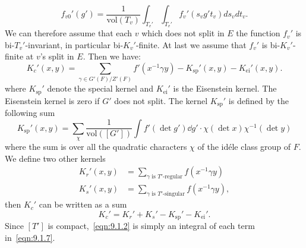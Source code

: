 \begin{equation*}
    f_{v0}'(g') = \frac{1}{\mathrm{vol}(T_v)} \int_{T_v'} \int_{T_v'} f_v'(s_v g' t_v) ds_v dt_v.
\end{equation*}
We can therefore assume that each $v$ which does not split in $E$ the function $f_v'$ is bi-$T_v'$-invariant, in particular 
bi-$K_v'$-finite. 
At last we assume that $f_v'$ is bi-$K_v'$-finite at $v$'s split in $E$. 
Then we have:
\begin{equation}
    K_c'(x, y) = \sum_{\gamma \in G'(F)/Z'(F)} f'(x^{-1}\gamma y) - K_{\mathrm{sp}}' (x, y) - K_{\mathrm{ei}}' (x, y).
\end{equation}
where $K_{\mathrm{sp}}'$ denote the special kernel and $K_{\mathrm{ei}}'$ is the Eisenstein kernel.
The Eisenstein kernel is zero if $G'$ does not split.
The kernel $K_{\mathrm{sp}}'$ is defined by the following sum
\begin{equation}
    \label{eqn:9.1.4}
    K_{\mathrm{sp}}'(x, y) = \sum_{\chi} \frac{1}{\mathrm{vol}([G'])} \int f'(\det g') \dd g' \cdot \chi(\det x)\chi^{-1}(\det y)
\end{equation}
where the sum is over all the quadratic characters $\chi$ of the id\'ele class group of $F$.
We define two other kernels
\begin{align}
    K_{r}'(x, y) &= \sum_{\gamma\text{ is }T'\text{-regular}} f(x^{-1}\gamma y) \\
    K_{s}'(x, y) &= \sum_{\gamma\text{ is }T'\text{-singular}} f(x^{-1}\gamma y),
\end{align}
then $K_c'$ can be written as a sum
\begin{equation}
    \label{eqn:9.1.7}
    K_c' = K_r' + K_s' - K_{\mathrm{sp}}' - K_{\mathrm{ei}}'.
\end{equation}
Since $[T']$ is compact,~\eqref{eqn:9.1.2} is simply an integral of each term in~\eqref{eqn:9.1.7}.


